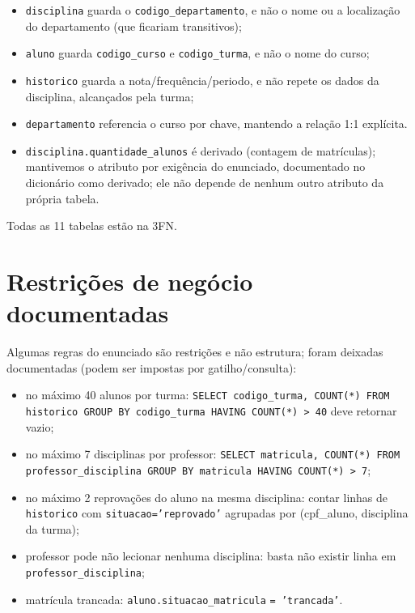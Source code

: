 \documentclass[12pt,a4paper]{article}
\begin{document}
\begin{itemize}
  \item \texttt{disciplina} guarda o \texttt{codigo\_departamento}, e
        não o nome ou a localização do departamento (que ficariam
        transitivos);
  \item \texttt{aluno} guarda \texttt{codigo\_curso} e
        \texttt{codigo\_turma}, e não o nome do curso;
  \item \texttt{historico} guarda a nota/frequência/periodo, e não
        repete os dados da disciplina, alcançados pela turma;
  \item \texttt{departamento} referencia o curso por chave, mantendo a
        relação 1:1 explícita.
  \item \texttt{disciplina.quantidade\_alunos} é derivado (contagem de
        matrículas); mantivemos o atributo por exigência do enunciado,
        documentado no dicionário como derivado; ele não depende de
        nenhum outro atributo da própria tabela.
\end{itemize}

Todas as 11 tabelas estão na 3FN.

\section{Restrições de negócio documentadas}
\label{sec:restr}

Algumas regras do enunciado são restrições e não estrutura; foram
deixadas documentadas (podem ser impostas por gatilho/consulta):

\begin{itemize}
  \item no máximo 40 alunos por turma:
        \texttt{SELECT codigo\_turma, COUNT(*) FROM historico
        GROUP BY codigo\_turma HAVING COUNT(*) > 40} deve retornar vazio;
  \item no máximo 7 disciplinas por professor:
        \texttt{SELECT matricula, COUNT(*) FROM professor\_disciplina
        GROUP BY matricula HAVING COUNT(*) > 7};
  \item no máximo 2 reprovações do aluno na mesma disciplina:
        contar linhas de \texttt{historico} com
        \texttt{situacao='reprovado'} agrupadas por
        (cpf\_aluno, disciplina da turma);
  \item professor pode não lecionar nenhuma disciplina: basta não
        existir linha em \texttt{professor\_disciplina};
  \item matrícula trancada: \texttt{aluno.situacao\_matricula}
        \texttt{= 'trancada'}.
\end{itemize}
\end{document}
